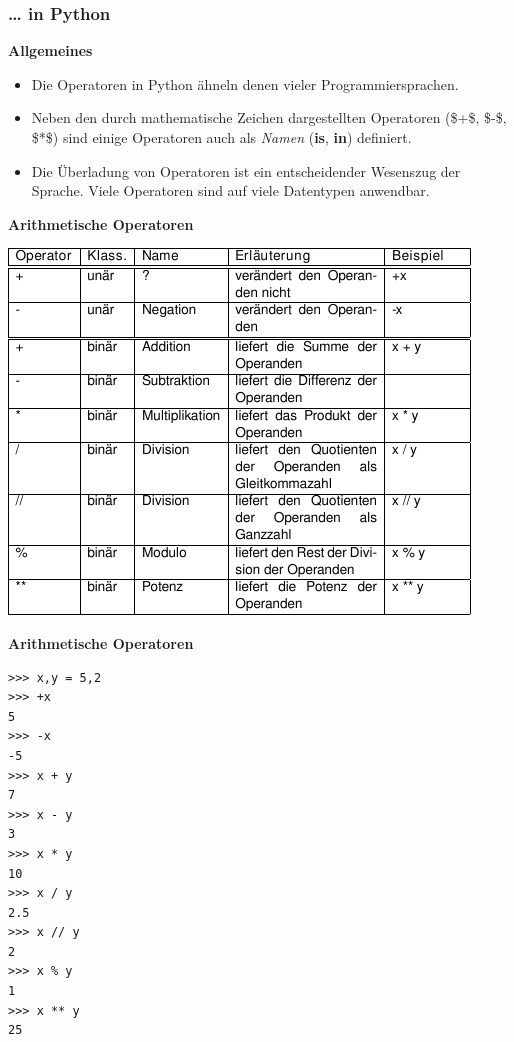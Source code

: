 \subsubsection{\ldots{} in Python}

\par\noindent\textbf{Allgemeines}

\begin{itemize}
\itemsep1pt\parskip0pt
\item
  {Die Operatoren in Python ähneln denen vieler Programmiersprachen.}
\item
  {Neben den durch mathematische Zeichen dargestellten Operatoren
  (\$+\$, \$-\$, \$*\$) sind einige Operatoren auch als \emph{Namen}
  (\textbf{is}, \textbf{in}) definiert.}
\item
  {Die Überladung von Operatoren ist ein entscheidender Wesenszug der
  Sprache. Viele Operatoren sind auf viele Datentypen anwendbar.}
\end{itemize}




\par\noindent\textbf{Arithmetische Operatoren}

\includegraphics[width=\textwidth]{img/operatoren.pdf}




\par\noindent\textbf{Arithmetische Operatoren}

\begin{verbatim}
>>> x,y = 5,2
>>> +x
5
>>> -x
-5
>>> x + y
7
>>> x - y
3
>>> x * y
10
>>> x / y
2.5
>>> x // y
2
>>> x % y
1
>>> x ** y
25
\end{verbatim}




